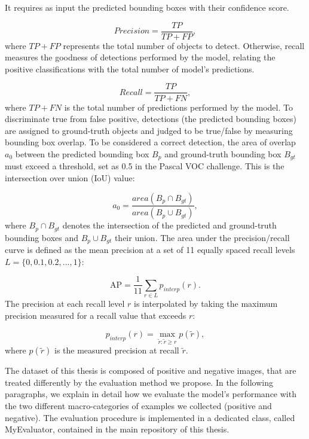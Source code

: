 It requires as input the predicted bounding boxes with their confidence score.

\begin{equation}
\label{eq:precision}
Precision = \frac{TP}{TP + FP},
\end{equation}
where $TP + FP$ represents the total number of objects to detect. Otherwise, recall measures the goodness of detections performed by the model, relating the positive classifications with the total number of model's predictions.

\begin{equation}
\label{eq:recall}
Recall = \frac{TP}{TP + FN},
\end{equation}
where $TP + FN$ is the total number of predictions performed by the model. 
To discriminate true from false positive, detections (the predicted bounding boxes) are assigned to  ground-truth objects and judged to be true/false by measuring bounding box overlap. To be considered a correct detection, the area of overlap $a_0$ between the predicted bounding
box $B_p$ and  ground-truth bounding box $B_{gt}$ must exceed a threshold, set as 0.5 in the Pascal VOC challenge. This is the intersection over union (IoU) value:

\begin{equation}
\label{eq:iou}
a_0 = \frac{area(B_p \cap B_{gt})}{area(B_p \cup B_{gt})},
\end{equation}
where $B_p \cap B_{gt}$ denotes the intersection of the predicted and
 ground-truth bounding boxes and $B_p \cup B_{gt}$ their union. The area under the precision/recall curve is defined as the mean precision at a set of 11 equally spaced recall levels $ L = \{0, 0.1, 0.2, ..., 1\}$:

\begin{equation}
\label{eq:11-point}
	\text{AP} = \frac{1}{11} \sum_{r \in L} p_{interp}(r).
\end{equation}
The precision at each recall level $r$ is interpolated by taking
the maximum precision measured for a recall value that exceeds $r$:

\begin{equation}
p_{interp} (r) = \max_{\tilde{r} : \tilde{r} \geq r} p(\tilde{r}),
\end{equation}
where $p(\tilde{r})$ is the measured precision at recall $\tilde{r}$. 

The dataset of this thesis is composed of positive and negative images, that are treated differently by the evaluation method we propose. In the following paragraphs, we explain in detail how we evaluate the model's performance with the two different macro-categories of examples we collected (positive and negative). The evaluation procedure is implemented in a dedicated class, called \textsf{MyEvaluator}, contained in the main repository of this thesis. 

